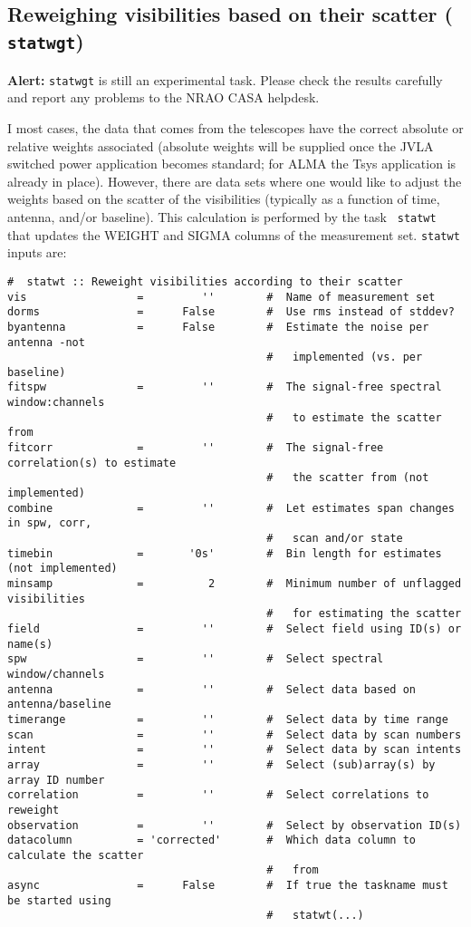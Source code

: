 {%
\subsection{Reweighing visibilities based on their scatter ({\tt
    statwgt})}
\label{section:cal.other.statwt}

{\bf Alert:} {\tt statwgt} is still an experimental task. Please check
the results carefully and report any problems to the NRAO CASA
helpdesk. 

I most cases, the data that comes from the telescopes have the correct
absolute or relative weights associated (absolute weights will be
supplied once the JVLA switched power application becomes standard; for
ALMA the Tsys application is already in place). However, there are
data sets where one would like to adjust the weights based on the
scatter of the visibilities (typically as a function of time, antenna,
and/or baseline). This calculation is performed by the task {\tt
  statwt} that updates the WEIGHT and SIGMA columns of the measurement
set. {\tt statwt} inputs are:

\small
\begin{verbatim} 
#  statwt :: Reweight visibilities according to their scatter
vis                 =         ''        #  Name of measurement set
dorms               =      False        #  Use rms instead of stddev?
byantenna           =      False        #  Estimate the noise per antenna -not
                                        #   implemented (vs. per baseline)
fitspw              =         ''        #  The signal-free spectral window:channels
                                        #   to estimate the scatter from
fitcorr             =         ''        #  The signal-free correlation(s) to estimate
                                        #   the scatter from (not implemented)
combine             =         ''        #  Let estimates span changes in spw, corr,
                                        #   scan and/or state
timebin             =       '0s'        #  Bin length for estimates (not implemented)
minsamp             =          2        #  Minimum number of unflagged visibilities
                                        #   for estimating the scatter
field               =         ''        #  Select field using ID(s) or name(s)
spw                 =         ''        #  Select spectral window/channels
antenna             =         ''        #  Select data based on antenna/baseline
timerange           =         ''        #  Select data by time range
scan                =         ''        #  Select data by scan numbers
intent              =         ''        #  Select data by scan intents
array               =         ''        #  Select (sub)array(s) by array ID number
correlation         =         ''        #  Select correlations to reweight
observation         =         ''        #  Select by observation ID(s)
datacolumn          = 'corrected'       #  Which data column to calculate the scatter
                                        #   from
async               =      False        #  If true the taskname must be started using
                                        #   statwt(...)
\end{verbatim}

}
